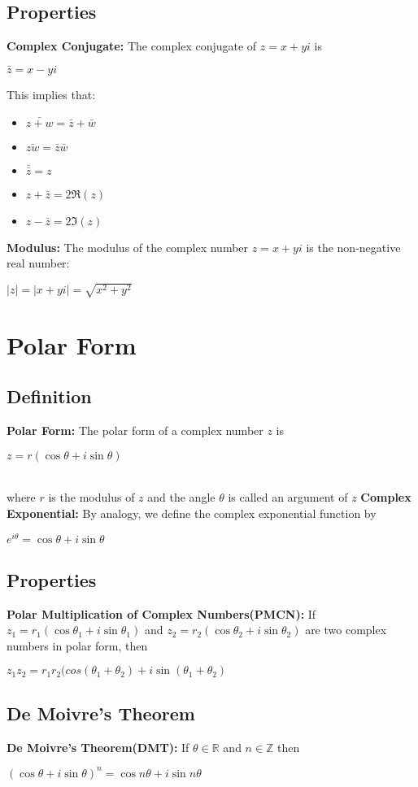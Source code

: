 \documentclass[12pt]{report}
\begin{document}
		\subsection{Properties}
			\textbf{Complex Conjugate:} The complex conjugate of $z = x + yi$ is \\
			\centerline{$\bar{z} = x - yi$}
			This implies that:
			\begin{itemize}
				\item $\bar{z+w} = \bar{z} + \bar{w}$
				\item $\bar{zw} = \bar{z} \bar{w}$
				\item $\bar{\bar{z}} = z$
				\item $z + \bar{z} = 2\Re(z)$
				\item $z - \bar{z} = 2\Im(z)$
			\end{itemize}
			\textbf{Modulus: } The modulus of the complex number $z = x + yi$ is the non-negative real number: \\
			\centerline{$|z| = |x + yi| = \sqrt{x^2 + y^2}$}
	\section{Polar Form}
		\subsection{Definition}
			\textbf{Polar Form:} The polar form of a complex number $z$ is \\
			\centerline{$z = r(\cos \theta + i \sin \theta)$} \\
			where $r$ is the modulus of $z$ and the angle $\theta$ is called an argument of $z$
			\textbf{Complex Exponential:} By analogy, we define the complex exponential function by\\
			\centerline{$e^{i\theta} = \cos \theta + i \sin \theta$}
		\subsection{Properties}
			\textbf{Polar Multiplication of Complex Numbers(PMCN):} If $z_1 = r_1(\cos \theta_1 + i \sin \theta_1)$ and $z_2 = r_2(\cos \theta_2 + i \sin \theta_2)$ are two complex numbers in polar form, then \\
			\centerline{$z_1z_2 = r_1r_2(cos(\theta_1 + \theta_2) + i \sin (\theta_1 + \theta_2)$}
		\subsection{De Moivre's Theorem}
			\textbf{De Moivre's Theorem(DMT):} If $\theta \in \mathbb{R}$ and $n \in \mathbb{Z}$ then \\
			\centerline{$(\cos \theta + i \sin \theta)^n = \cos n\theta + i \sin n\theta$}				
\end{document}
